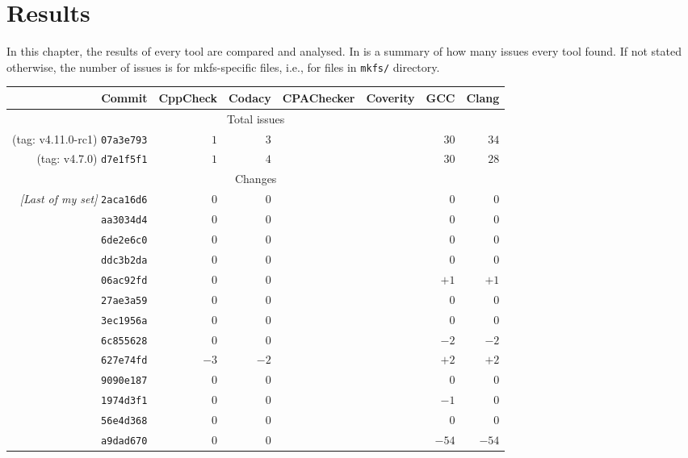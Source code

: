 
\chapter{Results}\label{chap:results}

In this chapter, the results of every tool are compared and analysed. In
 is a summary of how many issues every tool
found. If not stated otherwise, the number of issues is for mkfs-specific
files, i.e., for files in {\tt mkfs/} directory.

\begin{table}[h]
\begin{tabular}{|r||r|r|r|r|r|r|}
\hline
Commit & CppCheck & Codacy & CPAChecker & Coverity & GCC & Clang \\
\hline
\hline
\multicolumn{7}{|c|}{Total issues}\\
\hline
(tag: v4.11.0-rc1) {\tt 07a3e793} & $1$ & $3$ & & & $30$ & $34$ \\
\hline
(tag: v4.7.0) {\tt d7e1f5f1} & $1$ & $4$ & & & $30$ & $28$ \\
\hline
\hline
\multicolumn{7}{|c|}{Changes}\\
\hline
{\em [Last of my set]} {\tt 2aca16d6} & 0 & 0 & & & 0 & 0 \\
\hline
{\tt aa3034d4} & 0 & 0 & & & 0 & 0 \\
\hline
{\tt 6de2e6c0} & 0 & 0 & & & 0 & 0 \\
\hline
{\tt ddc3b2da} & 0 & 0 & & & 0 & 0\\
\hline
{\tt 06ac92fd} & 0 & 0 & & & $+1$ & $+1$\\
\hline
{\tt 27ae3a59} & 0 & 0 & & & 0 & 0 \\
\hline
{\tt 3ec1956a} & 0 & 0 & & & 0 & 0 \\
\hline
{\tt 6c855628} & 0 & 0 & & & $-2$ & $-2$ \\
\hline
{\tt 627e74fd} & $-3$ & $-2$ & & & $+2$ & $+2$ \\
\hline
{\tt 9090e187} & 0 & 0 & & & 0 & 0 \\
\hline
{\tt 1974d3f1} & 0 & 0 & & & $-1$ & 0 \\
\hline
{\tt 56e4d368} & 0 & 0 & & & 0 & 0 \\
\hline
{\tt a9dad670} & 0 & 0 & & & $-54$ & $-54$ \\

\end{tabular}
\end{table}
